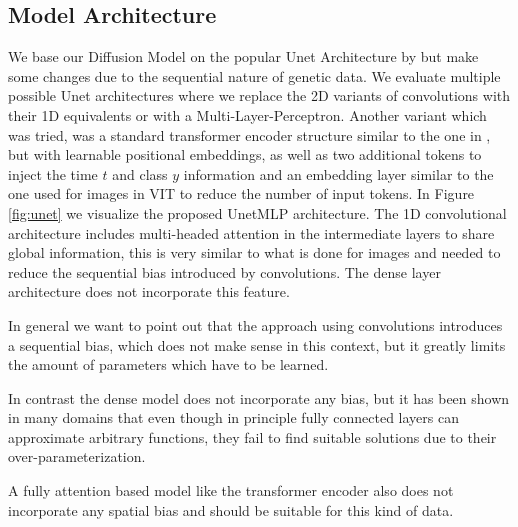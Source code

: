 \subsection{Model Architecture}
We base our Diffusion Model on the popular Unet Architecture by \citet{Unet} but make some changes due to the sequential nature of genetic data.
We evaluate multiple possible Unet architectures where we replace the 2D variants of convolutions with their 1D equivalents or with a Multi-Layer-Perceptron. Another variant which was tried, was a standard transformer encoder structure similar to the one in \cite{bert}, but with learnable positional embeddings, as well as two additional tokens to inject the time $t$ and class $y$ information and an embedding layer similar to the one used for images in VIT\citep{vit} to reduce the number of input tokens. In Figure \ref{fig:unet} we visualize the proposed UnetMLP architecture. The 1D convolutional architecture includes multi-headed attention in the intermediate layers to share global information, this is very similar to what is done for images and needed to reduce the sequential bias introduced by convolutions.
The dense layer architecture does not incorporate this feature.

In general we want to point out that the approach using convolutions introduces a sequential bias, which does not make sense in this context, but it greatly limits the amount of parameters which have to be learned.



In contrast the dense model does not incorporate any bias, but it has been shown in many domains that even though in principle fully connected layers can approximate arbitrary functions, they fail to find suitable solutions due to their over-parameterization.

A fully attention based model like the transformer encoder also does not incorporate any spatial bias and should be suitable for this kind of data.







